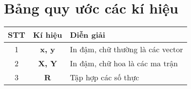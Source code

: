 \chapter*{\Huge Bảng quy ước các kí hiệu}

\setlength{\tabcolsep}{12pt} %
\renewcommand{\arraystretch}{1} %
\begin{tabular}{|c|c|p{10cm}|}
    \hline 
    \textbf{STT} & \textbf{Kí hiệu} & \textbf{Diễn giải}\\ [0.5ex]
    \hline 
    \hline 1 & \textbf{x, y} & In đậm, chữ thường là các vector\\
    \hline 2 & \textbf{X, Y} & In đậm, chữ hoa là các ma trận\\
    \hline 3 & \textbf{R} & Tập hợp các số thực\\
    \hline
\end{tabular}
